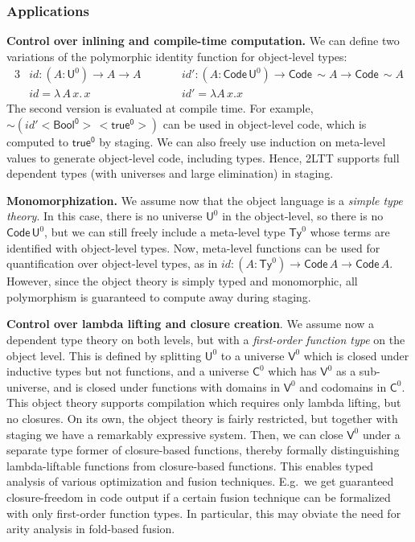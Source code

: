 \documentclass{easychair}
\newcommand{\U}{\mathsf{U}}
\newcommand{\Code}{\mathsf{Code}}
\newcommand{\Ty}{\mathsf{Ty}}
\newcommand{\V}{\mathsf{V}}
\newcommand{\C}{\mathsf{C}}
\begin{document}
\subsubsection*{Applications}

\textbf{Control over inlining and compile-time computation.} We can define two
variations of the polymorphic identity function for object-level types:
\begin{alignat*}{3}
  & \mathit{id} : (A : \U^0) \to A \to A \hspace{2em}&& \mathit{id'} : (A : \Code\,\U^0) \to \Code\,\sim\!A \to \Code\,\sim\!A\\
  & \mathit{id} = \lambda\,A\,x.\,x      && \mathit{id'} = \lambda A\,x.x
\end{alignat*}
The second version is evaluated at compile time. For example,
$\sim\!(\mathit{id'}<\!\mathsf{Bool^0}\!>\,<\!\mathsf{true^0}\!>)$ can be used
in object-level code, which is computed to $\mathsf{true^0}$ by staging. We can
also freely use induction on meta-level values to generate object-level code,
including types. Hence, 2LTT supports full dependent types (with universes and
large elimination) in staging.

\textbf{Monomorphization.} We assume now that the object language is a
\emph{simple type theory}. In this case, there is no universe $\U^0$ in the
object-level, so there is no $\Code\,\U^0$, but we can still freely include a
meta-level type $\Ty^0$ whose terms are identified with object-level types. Now,
meta-level functions can be used for quantification over object-level types, as
in $\mathit{id} : (A : \Ty^0) \to \Code\,A \to \Code\,A$. However, since the
object theory is simply typed and monomorphic, all polymorphism is guaranteed to
compute away during staging.

\textbf{Control over lambda lifting and closure creation}. We assume now a
dependent type theory on both levels, but with a \emph{first-order function
type} on the object level. This is defined by splitting $\U^0$ to a universe
$\V^0$ which is closed under inductive types but not functions, and a universe
$\C^0$ which has $\V^0$ as a sub-universe, and is closed under functions with
domains in $\V^0$ and codomains in $\C^0$. This object theory supports
compilation which requires only lambda lifting, but no closures. On its own, the
object theory is fairly restricted, but together with staging we have a
remarkably expressive system. Then, we can close $\V^0$ under a separate type
former of closure-based functions, thereby formally distinguishing
lambda-liftable functions from closure-based functions. This enables typed
analysis of various optimization and fusion techniques. E.g.\ we get guaranteed
closure-freedom in code output if a certain fusion technique can be formalized
with only first-order function types. In particular, this may obviate the need
for arity analysis \cite{DBLP:journals/cl/Breitner18} in fold-based fusion.
\end{document}
